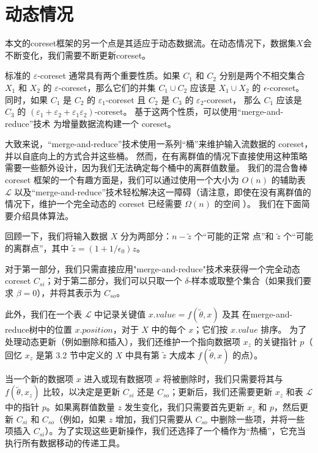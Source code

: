 \section{动态情况}

本文的coreset框架的另一个点是其适应于动态数据流。在动态情况下，数据集$X$会不断变化，我们需要不断更新coreset。

标准的 $\varepsilon$-coreset 通常具有两个重要性质。如果 $C_1$ 和 $C_2$ 分别是两个不相交集合 $X_1$ 
和 $X_2$ 的 $\varepsilon$-coreset，那么它们的并集 $C_1 \cup C_2$ 应该是 $X_1 \cup X_2$ 的 $\epsilon$-coreset。
同时，如果 $C_1$ 是 $C_2$ 的 $\varepsilon_1$-coreset 且 $C_2$ 是 $C_3$ 的 $\varepsilon_2$-coreset，
那么 $C_1$ 应该是 $C_3$ 的 $(\varepsilon_1 + \varepsilon_2 + \varepsilon_1 \varepsilon_2)$-coreset。
基于这两个性质，可以使用“merge-and-reduce”技术 \citep{BS80, HM04} 为增量数据流构建一个 coreset。


大致来说，“merge-and-reduce”技术使用一系列“桶”来维护输入流数据的 coreset，并以自底向上的方式合并这些桶。
然而，在有离群值的情况下直接使用这种策略需要一些额外设计，因为我们无法确定每个桶中的离群值数量。
我们的混合鲁棒 coreset 框架的一个有趣方面是，我们可以通过使用一个大小为 $O(n)$ 的辅助表 $\mathcal{L}$ 
以及“merge-and-reduce”技术轻松解决这一障碍（请注意，即使在没有离群值的情况下，维护一个完全动态的 coreset 已经需要 $\Omega(n)$ 的空间 \citep{HK20}）。
我们在下面简要介绍具体算法。

回顾一下，我们将输入数据 $X$ 分为两部分：$n - \tilde{z}$ 个“可能的正常
点”和 $\tilde{z}$ 个“可能的离群点”，其中 $\tilde{z} = (1 + 1/\epsilon_0)z$。

对于第一部分，我们只需直接应用"merge-and-reduce"技术来获得一个完全动态 coreset $C_{si}$；对于第二部分，我们可以只取一个 $\delta$-样本或取整个集合（如果我们要求 $\beta = 0$），并将其表示为 $C_{so}$。

此外，我们在一个表 $\mathcal{L}$ 中记录关键值 $x.value = f(\tilde{\theta}, x)$ 及其
在merge-and-reduce树中的位置 $x.position$，对于 $X$ 中的每个 $x$；它们按 $x.value$ 排序。
为了处理动态更新（例如删除和插入），我们还维护一个指向数据项 $x_z$ 的关键指针 $p$（
回忆 $x_z$ 是第 3.2 节中定义的 $X$ 中具有第 $\tilde{z}$ 大成本 $f(\tilde{\theta}, x)$ 的点）。

当一个新的数据项 $x$ 进入或现有数据项 $x$ 将被删除时，我们只需要将其与 $f(\tilde{\theta}, x_z)$ 比较，以决定是更新 $C_{si}$ 还是 $C_{so}$；更新后，我们还需要更新 $x_z$ 和表 $\mathcal{L}$ 中的指针 $p$。如果离群值数量 $z$ 发生变化，我们只需要首先更新 $x_z$ 和 $p$，然后更新 $C_{si}$ 和 $C_{so}$（例如，如果 $z$ 增加，我们只需要从 $C_{so}$ 中删除一些项，并将一些项插入 $C_{si}$）。为了实现这些更新操作，我们还选择了一个桶作为“热桶”，它充当执行所有数据移动的传递工具。

